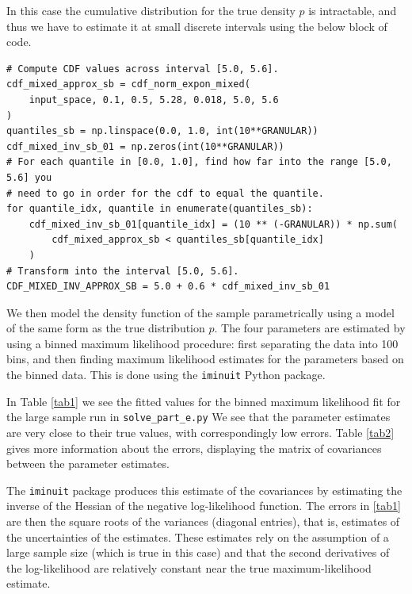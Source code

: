 \documentclass[12pt]{article}
\begin{document}
In this case the cumulative distribution for the true density $p$ is intractable, and thus we have to estimate it at small discrete intervals using the below block of code.

\begin{lstlisting}[caption=Code block producing array of values for inverse CDF of $p$ (e).]
# Compute CDF values across interval [5.0, 5.6].
cdf_mixed_approx_sb = cdf_norm_expon_mixed(
    input_space, 0.1, 0.5, 5.28, 0.018, 5.0, 5.6
)
quantiles_sb = np.linspace(0.0, 1.0, int(10**GRANULAR))
cdf_mixed_inv_sb_01 = np.zeros(int(10**GRANULAR))
# For each quantile in [0.0, 1.0], find how far into the range [5.0, 5.6] you
# need to go in order for the cdf to equal the quantile.
for quantile_idx, quantile in enumerate(quantiles_sb):
    cdf_mixed_inv_sb_01[quantile_idx] = (10 ** (-GRANULAR)) * np.sum(
        cdf_mixed_approx_sb < quantiles_sb[quantile_idx]
    )
# Transform into the interval [5.0, 5.6].
CDF_MIXED_INV_APPROX_SB = 5.0 + 0.6 * cdf_mixed_inv_sb_01
\end{lstlisting}

We then model the density function of the sample parametrically using a model of the same form as the true distribution $p$.
The four parameters are estimated by using a binned maximum likelihood procedure: first separating the data into 100 bins, and then finding maximum likelihood estimates for the parameters based on the binned data.
This is done using the \texttt{iminuit} Python package.

In Table \ref{tab1} we see the fitted values for the binned maximum likelihood fit for the large sample run in \texttt{solve\_part\_e.py}
We see that the parameter estimates are very close to their true values, with correspondingly low errors.
Table \ref{tab2} gives more information about the errors, displaying the matrix of covariances between the parameter estimates.

The \texttt{iminuit} package produces this estimate of the covariances by estimating the inverse of the Hessian of the negative log-likelihood function.
The errors in \ref{tab1} are then the square roots of the variances (diagonal entries), that is, estimates of the uncertainties of the estimates.
These estimates rely on the assumption of a large sample size (which is true in this case) and that the second derivatives of the log-likelihood are relatively constant near the true maximum-likelihood estimate.
\end{document}
